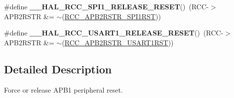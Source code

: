 \begin{DoxyCompactItemize}
\item 
\hypertarget{group___r_c_c___a_p_b2___force___release___reset_gad7b4bc8c8a9146529a175c45eecf25e5}{\#define {\bfseries \-\_\-\-\_\-\-H\-A\-L\-\_\-\-R\-C\-C\-\_\-\-S\-P\-I1\-\_\-\-R\-E\-L\-E\-A\-S\-E\-\_\-\-R\-E\-S\-E\-T}()~(R\-C\-C-\/$>$A\-P\-B2\-R\-S\-T\-R \&= $\sim$(\hyperlink{group___peripheral___registers___bits___definition_ga345f05d3508a9fd5128208761feb29fb}{R\-C\-C\-\_\-\-A\-P\-B2\-R\-S\-T\-R\-\_\-\-S\-P\-I1\-R\-S\-T}))}\label{group___r_c_c___a_p_b2___force___release___reset_gad7b4bc8c8a9146529a175c45eecf25e5}

\item 
\hypertarget{group___r_c_c___a_p_b2___force___release___reset_ga243061674e38d05d222697046d43813a}{\#define {\bfseries \-\_\-\-\_\-\-H\-A\-L\-\_\-\-R\-C\-C\-\_\-\-U\-S\-A\-R\-T1\-\_\-\-R\-E\-L\-E\-A\-S\-E\-\_\-\-R\-E\-S\-E\-T}()~(R\-C\-C-\/$>$A\-P\-B2\-R\-S\-T\-R \&= $\sim$(\hyperlink{group___peripheral___registers___bits___definition_gae7ae8e338b3b42ad037e9e5b6eeb2c41}{R\-C\-C\-\_\-\-A\-P\-B2\-R\-S\-T\-R\-\_\-\-U\-S\-A\-R\-T1\-R\-S\-T}))}\label{group___r_c_c___a_p_b2___force___release___reset_ga243061674e38d05d222697046d43813a}

\end{DoxyCompactItemize}


\subsection{Detailed Description}
Force or release A\-P\-B1 peripheral reset. 